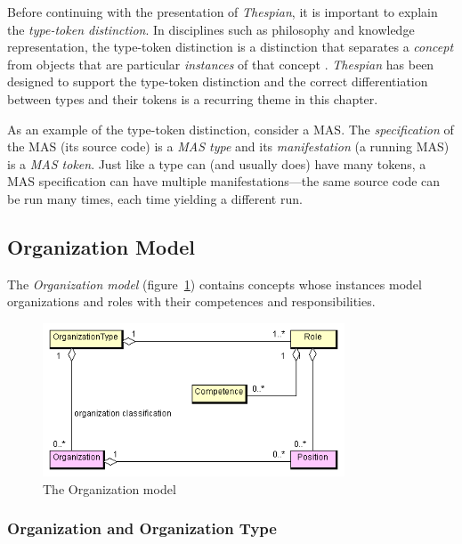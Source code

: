 Before continuing with the presentation of \textit{Thespian}, it is important to explain the \textit{type-token distinction}.
In disciplines such as philosophy and knowledge representation, the type-token distinction is a distinction that separates a \textit{concept} from objects that are particular \textit{instances} of that concept \cite{Wikipedia-TTD}.
\textit{Thespian} has been designed to support the type-token distinction and the correct differentiation between types and their tokens is a recurring theme in this chapter.

As an example of the type-token distinction, consider a MAS.
The \textit{specification} of the MAS (its source code) is a \textit{MAS type} and its \textit{manifestation} (a running MAS) is a \textit{MAS token}.
Just like a type can (and usually does) have many tokens, a MAS specification can have multiple manifestations---the same source code can be run many times, each time yielding a different run.

\subsection{Organization Model}

The \textit{Organization model} (figure~\ref{figure:thespian-organization-model}) contains concepts whose instances model organizations and roles with their competences and responsibilities.

\begin{figure}[ht]
	\centering
	\includegraphics[width=0.8\textwidth]{images/thespian/organization-model.png}
	\caption{The Organization model}
	\label{figure:thespian-organization-model}
\end{figure}

\subsubsection*{Organization and Organization Type}

